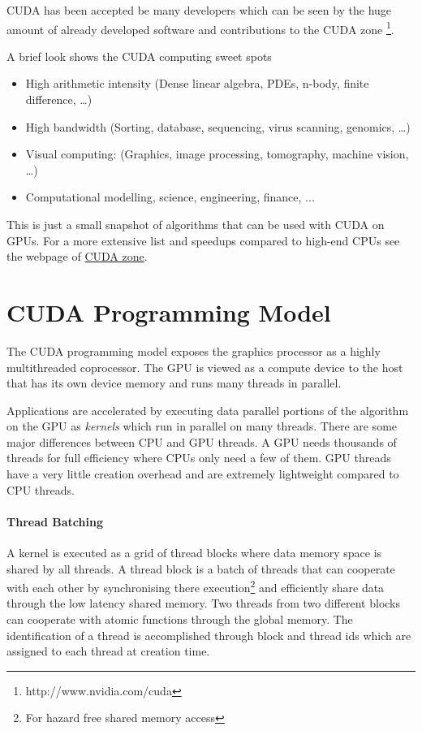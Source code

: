 \Gls{CUDA} has been accepted be many developers which can be seen by the huge
amount of already developed software and contributions to the \gls{CUDA}
zone \footnote{http://www.nvidia.com/cuda}.

A brief look shows the \gls{CUDA} computing sweet 
spots\citep{citeulike:3839013}

\begin{itemize}
	\item High arithmetic intensity (Dense linear algebra, PDEs, n-body, 
			finite difference, \ldots) 
	\item High bandwidth (Sorting, database,  sequencing, virus scanning, genomics, \ldots) 
	\item Visual computing: (Graphics, image processing, tomography, 
			machine vision, \ldots) 
	\item Computational modelling, science, engineering, finance, ... 			
\end{itemize} 

This is just a small snapshot of algorithms that can be used with \gls{CUDA} on
\glspl{GPU}. For a more extensive list and speedups compared to high-end
\glspl{CPU} see the webpage of {}
\href{http://www.nvidia.com/cuda}{\gls{CUDA} zone}. 

\section{CUDA Programming Model}%
\label{sub:cuda_programming_model} 
The \gls{CUDA} programming model exposes the graphics processor as a highly
multithreaded coprocessor. The \gls{GPU} is viewed as a compute device to the
host that has its own device memory and runs many threads in parallel.

Applications are accelerated by executing data parallel portions of the
algorithm on the \gls{GPU} as \emph{kernels} which run in parallel on many
threads. There are some major differences between \gls{CPU} and
\gls{GPU} threads. A \gls{GPU} needs thousands of threads for full efficiency
where \glspl{CPU} only need a few of them. \Gls{GPU} threads have a very little
creation overhead and are extremely lightweight compared to \gls{CPU} threads.

\paragraph{Thread Batching}%
\label{par:thread_batching} 
A kernel is executed as a grid of thread blocks where data memory space is
shared by all threads. A thread block is a batch of threads that can cooperate
with each other by synchronising there execution\footnote{For hazard free shared
memory access} and efficiently share data through the low latency shared
memory. Two threads from two different blocks can cooperate with atomic 
functions through the global memory. The identification of a thread is 
accomplished through block and thread ids which are assigned to each thread at 
creation time. 

